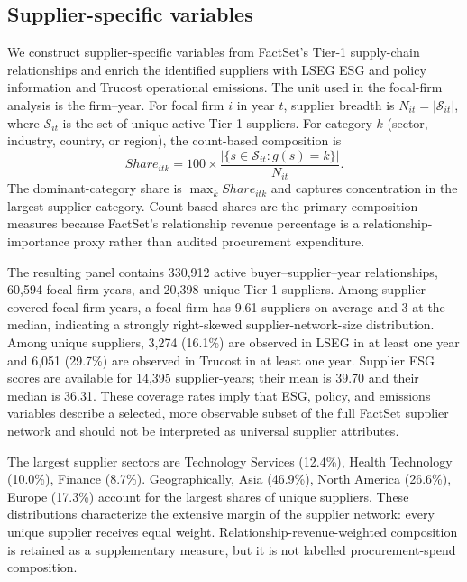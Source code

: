 \subsection{Supplier-specific variables}
\label{sec:supplier_variables}

We construct supplier-specific variables from FactSet's Tier-1 supply-chain relationships and enrich the identified suppliers with LSEG ESG and policy information and Trucost operational emissions. The unit used in the focal-firm analysis is the firm--year. For focal firm $i$ in year $t$, supplier breadth is $N_{it}=|\mathcal{S}_{it}|$, where $\mathcal{S}_{it}$ is the set of unique active Tier-1 suppliers. For category $k$ (sector, industry, country, or region), the count-based composition is
\begin{equation}
 Share_{itk} = 100\times\frac{|\{s\in\mathcal{S}_{it}:g(s)=k\}|}{N_{it}}.
\end{equation}
The dominant-category share is $\max_k Share_{itk}$ and captures concentration in the largest supplier category. Count-based shares are the primary composition measures because FactSet's relationship revenue percentage is a relationship-importance proxy rather than audited procurement expenditure.

The resulting panel contains 330,912 active buyer--supplier--year relationships, 60,594 focal-firm years, and 20,398 unique Tier-1 suppliers. Among supplier-covered focal-firm years, a focal firm has 9.61 suppliers on average and 3 at the median, indicating a strongly right-skewed supplier-network-size distribution. Among unique suppliers, 3,274 (16.1\%) are observed in LSEG in at least one year and 6,051 (29.7\%) are observed in Trucost in at least one year. Supplier ESG scores are available for 14,395 supplier-years; their mean is 39.70 and their median is 36.31. These coverage rates imply that ESG, policy, and emissions variables describe a selected, more observable subset of the full FactSet supplier network and should not be interpreted as universal supplier attributes.

The largest supplier sectors are Technology Services (12.4\%), Health Technology (10.0\%), Finance (8.7\%). Geographically, Asia (46.9\%), North America (26.6\%), Europe (17.3\%) account for the largest shares of unique suppliers. These distributions characterize the extensive margin of the supplier network: every unique supplier receives equal weight. Relationship-revenue-weighted composition is retained as a supplementary measure, but it is not labelled procurement-spend composition.

